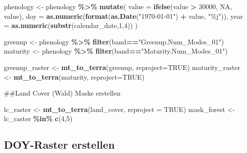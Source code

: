 \documentclass[
]{article}
\newenvironment{Shaded}{\begin{snugshade}}{\end{snugshade}}
\newcommand{\AttributeTok}[1]{\textcolor[rgb]{0.13,0.29,0.53}{#1}}
\newcommand{\ConstantTok}[1]{\textcolor[rgb]{0.56,0.35,0.01}{#1}}
\newcommand{\DecValTok}[1]{\textcolor[rgb]{0.00,0.00,0.81}{#1}}
\newcommand{\FunctionTok}[1]{\textcolor[rgb]{0.13,0.29,0.53}{\textbf{#1}}}
\newcommand{\NormalTok}[1]{#1}
\newcommand{\OtherTok}[1]{\textcolor[rgb]{0.56,0.35,0.01}{#1}}
\newcommand{\SpecialCharTok}[1]{\textcolor[rgb]{0.81,0.36,0.00}{\textbf{#1}}}
\newcommand{\StringTok}[1]{\textcolor[rgb]{0.31,0.60,0.02}{#1}}
\begin{document}
\begin{Shaded}
\begin{Highlighting}[]
\NormalTok{phenology }\OtherTok{\textless{}{-}}\NormalTok{ phenology }\SpecialCharTok{\%\textgreater{}\%}
  \FunctionTok{mutate}\NormalTok{(}
    \AttributeTok{value =} \FunctionTok{ifelse}\NormalTok{(value }\SpecialCharTok{\textgreater{}} \DecValTok{30000}\NormalTok{, }\ConstantTok{NA}\NormalTok{, value),}
    \AttributeTok{doy   =} \FunctionTok{as.numeric}\NormalTok{(}\FunctionTok{format}\NormalTok{(}\FunctionTok{as.Date}\NormalTok{(}\StringTok{"1970{-}01{-}01"}\NormalTok{) }\SpecialCharTok{+}\NormalTok{ value, }\StringTok{"\%j"}\NormalTok{)),}
    \AttributeTok{year  =} \FunctionTok{as.numeric}\NormalTok{(}\FunctionTok{substr}\NormalTok{(calendar\_date,}\DecValTok{1}\NormalTok{,}\DecValTok{4}\NormalTok{))}
\NormalTok{  )}

\NormalTok{greenup }\OtherTok{\textless{}{-}}\NormalTok{ phenology }\SpecialCharTok{\%\textgreater{}\%} \FunctionTok{filter}\NormalTok{(band}\SpecialCharTok{==}\StringTok{"Greenup.Num\_Modes\_01"}\NormalTok{)}
\NormalTok{maturity }\OtherTok{\textless{}{-}}\NormalTok{ phenology }\SpecialCharTok{\%\textgreater{}\%} \FunctionTok{filter}\NormalTok{(band}\SpecialCharTok{==}\StringTok{"Maturity.Num\_Modes\_01"}\NormalTok{)}

\NormalTok{greenup\_raster }\OtherTok{\textless{}{-}} \FunctionTok{mt\_to\_terra}\NormalTok{(greenup, }\AttributeTok{reproject=}\ConstantTok{TRUE}\NormalTok{)}
\NormalTok{maturity\_raster }\OtherTok{\textless{}{-}} \FunctionTok{mt\_to\_terra}\NormalTok{(maturity, }\AttributeTok{reproject=}\ConstantTok{TRUE}\NormalTok{)}
\end{Highlighting}
\end{Shaded}

\#\#Land Cover (Wald) Maske erstellen

\begin{Shaded}
\begin{Highlighting}[]
\NormalTok{lc\_raster }\OtherTok{\textless{}{-}} \FunctionTok{mt\_to\_terra}\NormalTok{(land\_cover, }\AttributeTok{reproject =} \ConstantTok{TRUE}\NormalTok{)}
\NormalTok{mask\_forest }\OtherTok{\textless{}{-}}\NormalTok{ lc\_raster }\SpecialCharTok{\%in\%} \FunctionTok{c}\NormalTok{(}\DecValTok{4}\NormalTok{,}\DecValTok{5}\NormalTok{)}
\end{Highlighting}
\end{Shaded}

\subsection{DOY-Raster erstellen}\label{doy-raster-erstellen}
\end{document}

